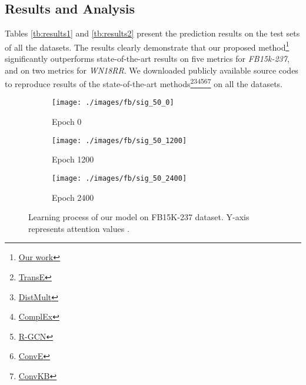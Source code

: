 \documentclass[11pt,a4paper]{article}
\begin{document}
\subsection{Results and Analysis}
\label{ssec:results}
Tables \ref{tb:results1} and \ref{tb:results2} present the prediction results on the test sets of all the datasets. 
The results clearly demonstrate that our proposed method\footnote{\href{https://github.com/deepakn97/relationPrediction}{Our work}} significantly outperforms state-of-the-art results on five metrics for \emph{FB15k-237}, and on two metrics for \emph{WN18RR}.  
We downloaded publicly available source codes to reproduce results of the state-of-the-art  methods\footnote{\href{https://github.com/datquocnguyen/STransE}{TransE}}\footnote{\href{https://github.com/TimDettmers/ConvE}{DistMult}}\footnote{\href{https://github.com/TimDettmers/ConvE}{ComplEx}}\footnote{\href{https://github.com/MichSchli/RelationPrediction}{R-GCN}}\footnote{\href{https://github.com/TimDettmers/ConvE}{ConvE}}\footnote{\href{https://github.com/daiquocnguyen/ConvKB}{ConvKB}} on all the datasets.
\begin{figure*}[t]
  \centering
  \hspace{-1.9cm}
  \begin{subfigure}[b]{0.2\linewidth}\label{hfb:a}
    \texttt{[image: ./images/fb/sig\_50\_0]}
    \caption{Epoch 0}
  \end{subfigure}
  \hspace{2.1cm}
  \begin{subfigure}[b]{0.2\linewidth}\label{hfb:c}
    \texttt{[image: ./images/fb/sig\_50\_1200]}
    \caption{Epoch 1200}
  \end{subfigure}
  \hspace{2.1cm}
  \begin{subfigure}[b]{0.2\linewidth}\label{hfb:e}
    \texttt{[image: ./images/fb/sig\_50\_2400]}
    \caption{Epoch 2400}
  \end{subfigure}
  \caption{Learning process of our model on FB15K-237 dataset. Y-axis represents attention values .}
  \label{fig:theat_fb}
\end{figure*}
\end{document}
